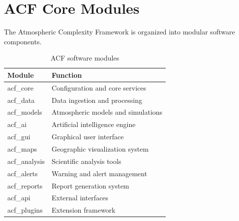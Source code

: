 \section{ACF Core Modules}

The Atmospheric Complexity Framework is organized into modular
software components.


\begin{table}[h]

\centering

\begin{tabular}{ll}

\toprule

Module & Function \\

\midrule

acf\_core & Configuration and core services \\

acf\_data & Data ingestion and processing \\

acf\_models & Atmospheric models and simulations \\

acf\_ai & Artificial intelligence engine \\

acf\_gui & Graphical user interface \\

acf\_maps & Geographic visualization system \\

acf\_analysis & Scientific analysis tools \\

acf\_alerts & Warning and alert management \\

acf\_reports & Report generation system \\

acf\_api & External interfaces \\

acf\_plugins & Extension framework \\

\bottomrule

\end{tabular}

\caption{ACF software modules}

\end{table}
